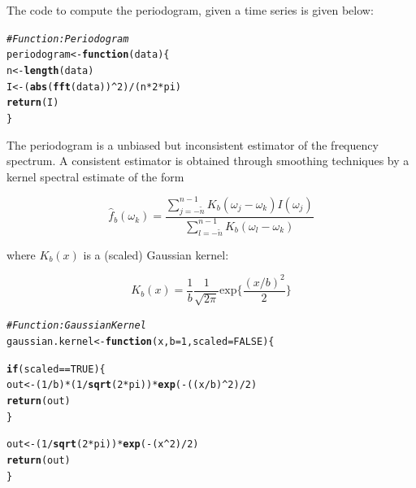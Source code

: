 \documentclass{article}\usepackage[]{graphicx}\usepackage[]{color}
\makeatletter
\newcommand{\hlnum}[1]{\textcolor[rgb]{0.686,0.059,0.569}{#1}}%
\newcommand{\hlcom}[1]{\textcolor[rgb]{0.678,0.584,0.686}{\textit{#1}}}%
\newcommand{\hlopt}[1]{\textcolor[rgb]{0,0,0}{#1}}%
\newcommand{\hlstd}[1]{\textcolor[rgb]{0.345,0.345,0.345}{#1}}%
\newcommand{\hlkwa}[1]{\textcolor[rgb]{0.161,0.373,0.58}{\textbf{#1}}}%
\newcommand{\hlkwb}[1]{\textcolor[rgb]{0.69,0.353,0.396}{#1}}%
\newcommand{\hlkwc}[1]{\textcolor[rgb]{0.333,0.667,0.333}{#1}}%
\newcommand{\hlkwd}[1]{\textcolor[rgb]{0.737,0.353,0.396}{\textbf{#1}}}%
\newenvironment{kframe}{%
 \def\at@end@of@kframe{}%
 \ifinner\ifhmode%
  \def\at@end@of@kframe{\end{minipage}}%
  \begin{minipage}{\columnwidth}%
 \fi\fi%
 \def\FrameCommand##1{\hskip\@totalleftmargin \hskip-\fboxsep
 \colorbox{shadecolor}{##1}\hskip-\fboxsep
     \hskip-\linewidth \hskip-\@totalleftmargin \hskip\columnwidth}%
 \MakeFramed {\advance\hsize-\width
   \@totalleftmargin\z@ \linewidth\hsize
   \@setminipage}}%
 {\par\unskip\endMakeFramed%
 \at@end@of@kframe}
\newenvironment{knitrout}{}{} %
\makeatother
\begin{document}
The code to compute the periodogram, given a time series is given below:

\begin{knitrout}\footnotesize
{}\color{fgcolor}\begin{kframe}
\begin{alltt}
\hlcom{# Function: Periodogram}
\hlstd{periodogram} \hlkwb{<-} \hlkwa{function}\hlstd{(}\hlkwc{data}\hlstd{) \{}
  \hlstd{n} \hlkwb{<-} \hlkwd{length}\hlstd{(data)}
  \hlstd{I} \hlkwb{<-} \hlstd{(}\hlkwd{abs}\hlstd{(}\hlkwd{fft}\hlstd{(data))}\hlopt{^}\hlnum{2}\hlstd{)}\hlopt{/}\hlstd{(n}\hlopt{*}\hlnum{2}\hlopt{*}\hlstd{pi)}
  \hlkwd{return}\hlstd{(I)}
\hlstd{\}}
\end{alltt}
\end{kframe}
\end{knitrout}

The periodogram is a unbiased but inconsistent estimator of the frequency spectrum.
A consistent estimator is obtained through smoothing techniques by a kernel spectral estimate of the form 

\begin{equation}
\label{eq:smoothed_periodogram}
\boxed{
\hat{f}_{b}(\omega_k) = \dfrac{\sum_{j = -\tilde{n}}^{n - 1} K_b(\omega_j - \omega_k) I(\omega_j)}{\sum_{l= -\tilde{n}}^{n - 1}K_b(\omega_l - \omega_k)}
}
\end{equation}

where $K_b(x)$ is a (scaled) Gaussian kernel:

\begin{equation}
\label{eq:gaussian_kernel}
K_b(x) = \frac{1}{b}\frac{1}{\sqrt{2\pi}}\text{exp}\Big\{ \dfrac{(x/b)^2}{2}\Big\}
\end{equation}

\begin{knitrout}\footnotesize
{}\color{fgcolor}\begin{kframe}
\begin{alltt}
\hlcom{# Function: Gaussian Kernel}
\hlstd{gaussian.kernel} \hlkwb{<-} \hlkwa{function}\hlstd{(}\hlkwc{x}\hlstd{,} \hlkwc{b} \hlstd{=} \hlnum{1}\hlstd{,} \hlkwc{scaled} \hlstd{=} \hlnum{FALSE}\hlstd{) \{}

  \hlkwa{if}\hlstd{(scaled} \hlopt{==} \hlnum{TRUE}\hlstd{) \{}
    \hlstd{out} \hlkwb{<-} \hlstd{(}\hlnum{1}\hlopt{/}\hlstd{b)} \hlopt{*} \hlstd{(}\hlnum{1}\hlopt{/}\hlkwd{sqrt}\hlstd{(}\hlnum{2}\hlopt{*}\hlstd{pi))} \hlopt{*} \hlkwd{exp}\hlstd{(}\hlopt{-}\hlstd{((x}\hlopt{/}\hlstd{b)}\hlopt{^}\hlnum{2}\hlstd{)}\hlopt{/}\hlnum{2}\hlstd{)}
    \hlkwd{return}\hlstd{(out)}
  \hlstd{\}}

  \hlstd{out} \hlkwb{<-} \hlstd{(}\hlnum{1}\hlopt{/}\hlkwd{sqrt}\hlstd{(}\hlnum{2}\hlopt{*}\hlstd{pi))} \hlopt{*} \hlkwd{exp}\hlstd{(}\hlopt{-}\hlstd{(x}\hlopt{^}\hlnum{2}\hlstd{)}\hlopt{/}\hlnum{2}\hlstd{)}
  \hlkwd{return}\hlstd{(out)}
\hlstd{\}}
\end{alltt}
\end{kframe}
\end{knitrout}
\end{document}
